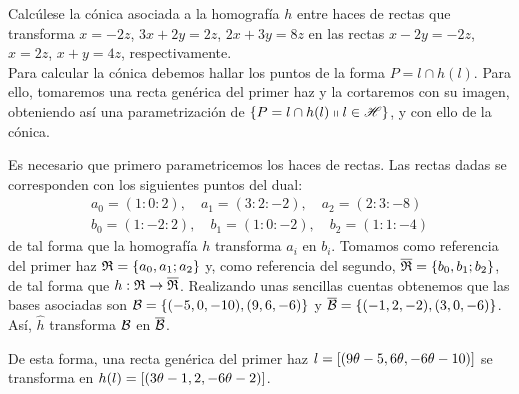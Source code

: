 \begin{exa}
	Calcúlese la cónica asociada a la homografía $h$ entre haces de rectas que transforma $x=-2z$, $3x+2y=2z$, $2x+3y=8z$ en las rectas $x-2y=-2z$, $x=2z$, $x+y=4z$, respectivamente.\\
	
	Para calcular la cónica debemos hallar los puntos de la forma $P=l\cap h(l)$. Para ello, tomaremos una recta genérica del primer haz y la cortaremos con su imagen, obteniendo así una parametrización de $\{P=l\cap h(l)\shortparallel l\in \mathscr{H}\}$, y con ello de la cónica.
	
	Es necesario que primero parametricemos los haces de rectas. Las rectas dadas se corresponden con los siguientes puntos del dual:
	\begin{equation*}
		\begin{split}
			a_0=(1:0:2), \quad a_1=(3:2:-2), \quad a_2=(2:3:-8)\\
			b_0=(1:-2:2), \quad b_1=(1:0:-2), \quad b_2=(1:1:-4)
		\end{split}
	\end{equation*}
	de tal forma que la homografía $h$ transforma $a_i$ en $b_i$. Tomamos como referencia del primer haz $\mathfrak{R}=\{a_0,a_1;a_2\}$ y, como referencia del segundo, $\overline{\mathfrak{R}}=\{b_0,b_1;b_2\}$, de tal forma que $h:\mathfrak{R}\rightarrow  \overline{\mathfrak{R}}$. Realizando unas sencillas cuentas obtenemos que las bases asociadas son $\mathcal{B}=\{(-5,0,-10),(9,6,-6)\}$ y $\overline{\mathcal{B}}=\{(-1,2,-2),(3,0,-6)\}$. Así, $\widehat{h}$ transforma $\mathcal{B}$ en $\overline{\mathcal{B}}$.
	
	De esta forma, una recta genérica del primer haz $l=\left [ (9\theta-5,6\theta,-6\theta-10) \right ]$ se transforma en $h(l)=\left [ (3\theta-1,2, -6\theta-2) \right ]$.
	

\end{exa}
